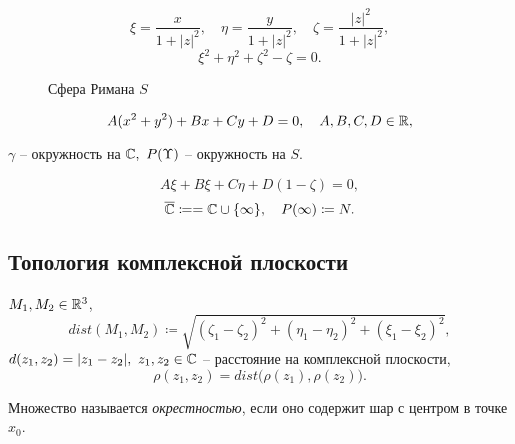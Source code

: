 \begin{note}
    \[
        \xi = \frac{x}{1 + | z |^2 }, \quad \eta = \frac{y}{1 + | z |^2 }, \quad \zeta = \frac{| z |^2 }{1 + | z |^2 },
    \]
    \[
        \xi^2 + \eta^2 + \zeta ^2 - \zeta = 0.
    \]
    \begin{figure}[H]
        \centering
        \caption{Сфера Римана $ S $}
        \label{fig:fig_01}
    \end{figure}

    \[
        A(x^2 + y^2) + Bx + Cy + D = 0, \quad A,B,C,D \in \mathbb{R},
    \]
    \begin{center}
        $ \gamma  $ -- окружность на $ \mathbb{C}, \ P(\Upsilon) $ -- окружность на $ S $.
    \end{center}

    \[
        A\xi + B\xi + C\eta + D(1-\zeta) = 0,
    \]
    \[
        \overline{\mathbb{C}} \coloneqq = \mathbb{C} \cup \{\infty\}, \quad P(\infty) \coloneqq N.
    \]
\end{note}

\subsection{Топология комплексной плоскости}

\begin{note}
    $ M_1,M_2 \in \mathbb{R}^3 $,
    \[
        dist(M_1,M_2)\coloneqq \sqrt{(\zeta_1 - \zeta_2)^2 + (\eta_1 - \eta_2)^2 + (\xi_1 - \xi_2)^2},
    \]
    $ d(z_1,z_2) = | z_1-z_2 |, \ z_1,z_2 \in \mathbb{C} $ -- расстояние на комплексной плоскости,
    \[
        \rho(z_1,z_2) = dist\bigl(\rho(z_1),\rho(z_2)\bigr).
    \]
\end{note}

\begin{definition}[Окрестность]
    Множество называется \emph{окрестностью}, если оно содержит шар с центром в точке $ x_0 $.
\end{definition}